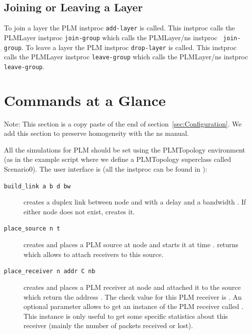 {\subsection{Joining or Leaving a Layer}
To join a layer the PLM instproc {\tt add-layer} is called. This instproc
calls the PLMLayer instproc {\tt join-group} which calls the PLMLayer/ns instproc {\tt
  join-group}.
To leave a layer the PLM instproc {\tt drop-layer} is called. This instproc
calls the PLMLayer instproc {\tt leave-group} which calls the PLMLayer/ns instproc {\tt
  leave-group}.

\section{Commands at a Glance}
Note: This section is a copy paste of the end of
section~\ref{sec:Configuration}. We add this section to preserve homogeneity with
the ns manual.

All the simulations for PLM should be set using the PLMTopology environment (as
in the example script where we define a PLMTopology superclass called Scenario0). The
user interface is (all the instproc can be found in ):
\begin{description}
\item[\tt build\_link a b d bw] creates a duplex link between node
   and  with a delay  and a bandwidth . If
  either node does not exist,  creates it.
\item[\tt place\_source n t] creates and places a PLM source at node  and
  starts it at time .  returns  which
  allows to attach receivers to this source.
\item[\tt place\_receiver n addr C nb] creates and places a PLM receiver at node
   and attached it to the source which return the address . The
  check value for this PLM receiver is . An optional parameter 
  allows to get an instance of the PLM receiver called . This
  instance is only useful to get some specific statistics about this receiver
  (mainly the number of packets received or lost). %
\end{description}
}


